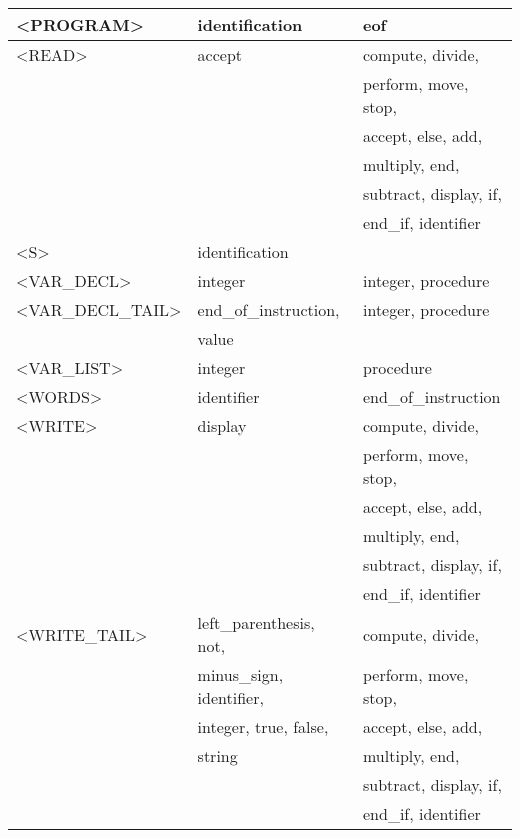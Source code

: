 \begin{longtable}{|l|l|l|}
  \hline
<PROGRAM>  &  identification &   eof \\ 
  \hline
<READ>  &  accept &   compute, divide, \\ 
  &  &   perform, move, stop, \\ 
  &  &   accept, else, add, \\ 
  &  &   multiply, end, \\ 
  &  &   subtract, display, if, \\ 
  &  &   end\_if, identifier \\ 
  \hline
<S>  &  identification &   \\ 
  \hline
<VAR\_DECL>  &  integer &   integer, procedure \\ 
  \hline
<VAR\_DECL\_TAIL>  &  end\_of\_instruction, &   integer, procedure \\ 
  &  value &   \\ 
  \hline
<VAR\_LIST>  &  integer &   procedure \\ 
  \hline
<WORDS>  &  identifier &   end\_of\_instruction \\ 
  \hline
<WRITE>  &  display &   compute, divide, \\ 
  &  &   perform, move, stop, \\ 
  &  &   accept, else, add, \\ 
  &  &   multiply, end, \\ 
  &  &   subtract, display, if, \\ 
  &  &   end\_if, identifier \\ 
  \hline
<WRITE\_TAIL>  &  left\_parenthesis, not, &   compute, divide, \\ 
  &  minus\_sign, identifier, &   perform, move, stop, \\ 
  &  integer, true, false, &   accept, else, add, \\ 
  &  string &   multiply, end, \\ 
  &  &   subtract, display, if, \\ 
  &  &   end\_if, identifier \\ 
  \hline
  
  \end{longtable}
